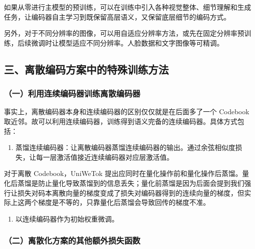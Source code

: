 如果从零进行主模型的预训练，可以在训练中引入各种视觉整体、细节理解和生成任务，让编码器自主学习到既保留高层语义，又保留底层细节的编码方式。

另外，对于不同分辨率的图像，可以用自适应分辨率方法，或先在固定分辨率预训练，后续微调时让模型适应不同分辨率。人脸数据和文字图像等可精调。

\hypertarget{ux4e09ux79bbux6563ux7f16ux7801ux65b9ux6848ux4e2dux7684ux7279ux6b8aux8badux7ec3ux65b9ux6cd5}{%
\subsection{三、离散编码方案中的特殊训练方法}\label{ux4e09ux79bbux6563ux7f16ux7801ux65b9ux6848ux4e2dux7684ux7279ux6b8aux8badux7ec3ux65b9ux6cd5}}

\hypertarget{ux4e00ux5229ux7528ux8fdeux7eedux7f16ux7801ux5668ux8badux7ec3ux79bbux6563ux7f16ux7801ux5668}{%
\subsubsection{（一）利用连续编码器训练离散编码器}\label{ux4e00ux5229ux7528ux8fdeux7eedux7f16ux7801ux5668ux8badux7ec3ux79bbux6563ux7f16ux7801ux5668}}

事实上，离散编码器本身和连续编码器的区别仅仅就是在后面多了一个 Codebook 取近邻。故可以利用连续编码器，训练得到语义完备的连续编码器。具体方式包括：

\begin{enumerate}
\def\labelenumi{\arabic{enumi}.}
\tightlist
\item
  蒸馏连续编码器：让离散编码器蒸馏连续编码器的输出。通过余弦相似度损失，让每一层激活值接近连续编码器对应层激活值。
\end{enumerate}

对于离散 Codebook，UniWeTok 提出应同时在量化操作前和量化操作后蒸馏。量化后蒸馏是防止量化导致蒸馏到的信息丢失；量化前蒸馏是因为后面会提到我们强行让损失对码本离散向量的梯度变成了损失对编码器得到的连续向量的梯度，但实际上这两个梯度是不等的，只靠量化后蒸馏会导致回传的梯度不准。

\begin{enumerate}
\def\labelenumi{\arabic{enumi}.}
\setcounter{enumi}{1}
\tightlist
\item
  以连续编码器作为初始权重微调。
\end{enumerate}

\hypertarget{ux4e8cux79bbux6563ux5316ux65b9ux6848ux7684ux5176ux4ed6ux989dux5916ux635fux5931ux51fdux6570}{%
\subsubsection{（二）离散化方案的其他额外损失函数}\label{ux4e8cux79bbux6563ux5316ux65b9ux6848ux7684ux5176ux4ed6ux989dux5916ux635fux5931ux51fdux6570}}

